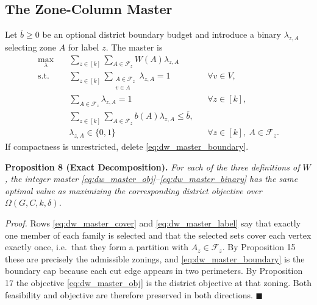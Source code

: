 \documentclass{article}
\begin{document}
\subsection{The Zone-Column Master}
\label{app:dw_master}
Let $\overline b \geq 0$ be an optional district boundary budget and introduce a
binary $\lambda_{z,A}$ selecting zone $A$ for label $z$. The master is
\begin{align}
\max_{\lambda}\quad
& \sum_{z\in[k]}\sum_{A\in\mathcal{F}_z}W(A)\lambda_{z,A}
\label{eq:dw_master_obj} \\
\text{s.t.}\quad
& \sum_{z\in[k]}\sum_{\substack{A\in\mathcal{F}_z\\v\in A}}\lambda_{z,A}=1
&& \forall v\in V, \label{eq:dw_master_cover} \\
& \sum_{A\in\mathcal{F}_z}\lambda_{z,A}=1
&& \forall z\in[k], \label{eq:dw_master_label} \\
& \sum_{z\in[k]}\sum_{A\in\mathcal{F}_z}b(A)\lambda_{z,A}\leq\overline{b},
\label{eq:dw_master_boundary} \\
& \lambda_{z,A}\in\{0,1\}
&& \forall z\in[k],\ A\in\mathcal{F}_z. \label{eq:dw_master_binary}
\end{align}
If compactness is unrestricted, delete \eqref{eq:dw_master_boundary}.

\noindent\textbf{Proposition 8 (Exact Decomposition).} \textit{For each of the
three definitions of $W$, the integer master
\eqref{eq:dw_master_obj}--\eqref{eq:dw_master_binary} has the same optimal value
as maximizing the corresponding district objective over
$\Omega(G, C, k, \delta)$.}

\textit{Proof.} Rows \eqref{eq:dw_master_cover} and \eqref{eq:dw_master_label}
say that exactly one member of each family is selected and that the selected
sets cover each vertex exactly once, i.e.\ that they form a partition with
$A_z \in \mathcal F_z$. By Proposition 15 these are precisely the admissible
zonings, and \eqref{eq:dw_master_boundary} is the boundary cap because each cut
edge appears in two perimeters. By Proposition 17 the objective
\eqref{eq:dw_master_obj} is the district objective at that zoning. Both
feasibility and objective are therefore preserved in both directions.
$\blacksquare$
\end{document}
